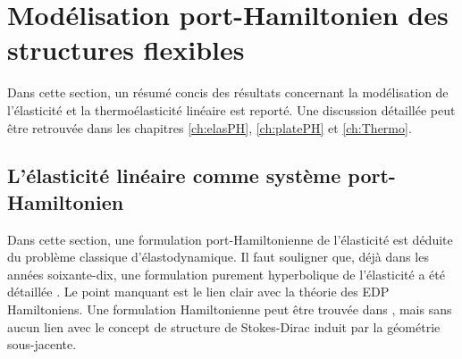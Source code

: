 \section{Mod\'elisation port-Hamiltonien des structures flexibles}
Dans cette section, un résumé concis des résultats concernant la modélisation de l'élasticité et la thermoélasticité linéaire est reporté. Une discussion détaillée peut être retrouvée dans les chapitres \ref{ch:elasPH}, \ref{ch:platePH} et \ref{ch:Thermo}.


\subsection*{L'élasticité linéaire comme système port-Hamiltonien}

Dans cette section, une formulation port-Hamiltonienne de l'élasticité est déduite du problème classique d'élastodynamique. Il faut souligner que, déjà dans les années soixante-dix, une formulation purement hyperbolique de l'élasticité a été détaillée \cite{hughes1978classical}. Le point manquant est le lien clair avec la théorie des EDP Hamiltoniens. Une formulation Hamiltonienne peut être trouvée dans \cite[Chapitre 16]{grinfield2015}, mais sans aucun lien avec le concept de structure de Stokes-Dirac induit par la géométrie sous-jacente. \\


